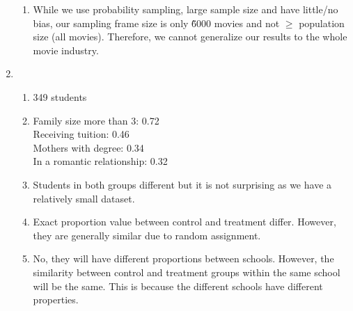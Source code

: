 \documentclass[12pt, a4paper]{article}
\begin{document}
\begin{enumerate}[Q\arabic*.]
\begin{enumerate}[(\alph*.)]
      \item While we use probability sampling, large sample size and have little/no bias, our sampling frame size is only \~6000 movies and not $\geq$ population size (all movies). Therefore, we cannot generalize our results to the whole movie industry. 
    \end{enumerate}

  \pagebreak
\item 
  \begin{enumerate}[(\alph*.)]
    \item 349 students

    \item Family size more than 3:  0.72\\
      Receiving tuition:  0.46\\
      Mothers with degree:  0.34\\
      In a romantic relationship:  0.32 

    \item Students in both groups different but it is not surprising as we have a relatively small dataset.

    \item Exact proportion value between control and treatment differ. However, they are generally similar due to random assignment.

    \item No, they will have different proportions between schools. However, the similarity between control and treatment groups within the same school will be the same. This is because the different schools have different properties.
  \end{enumerate}
\end{enumerate}
\end{document}
